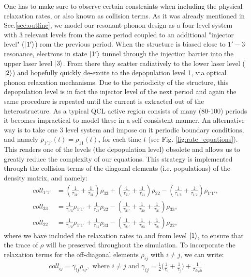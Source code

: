 \documentclass[10pt,english,fleqn]{article}%
\begin{document}
One has to make sure to observe certain constraints when including the physical relaxation rates, or also known as collision terms. As it was already mentioned in Sec.\ref{sec:outline}, we model our resonant-phonon design as a four level system with 3 relevant levels from the same period coupled to an additional "injector level" ($\Ket{1'}$)  rom the previous period. When the structure is biased close to $1'-3$ resonance, electrons in state $\Ket{1'}$ tunnel through the injection barrier into the upper
laser level $\Ket{3}$. From there they scatter radiatively to the lower laser level ($\Ket{2}$) and hopefully quickly de-excite to the depopulation level 1, via 
optical phonon relaxation mechanisms. Due to the periodicity of the structure, this depopulation level is in fact the injector level of the next period and again 
the same procedure is repeated until the current is extracted out of the heterostructure. As a typical QCL active region consists of many (80-100) 
periods it becomes impractical to model these in a self consistent manner. An alternative way is to take one 3 level system and impose on it periodic 
boundary conditions, and namely $\rho_{1'1'}(t) = \rho_{11}(t)$, for each time $t$ (see Fig. \ref{fig:rate_equations}). This renders one of the levels (the depopulation level) obsolete and allows us to greatly reduce the complexity of our equations. This strategy is implemented through the collision terms of the diagonal elements (i.e. populations) of the density matrix, and namely:
\begin{align}
 coll_{1'1'} &= (\frac{1}{\tau_{31'}}  + \frac{1}{\tau_{31}})\rho_{33} + (\frac{1}{\tau_{21'}}  + \frac{1}{\tau_{21}})\rho_{22}
 - (\frac{1}{\tau_{1'3}}  + \frac{1}{\tau_{1'2}} )\rho_{1'1'}, \\
 coll_{33} &= \frac{1}{\tau_{1'3}} \rho_{1'1'} + \frac{1}{\tau_{23}}\rho_{22}
 - (\frac{1}{\tau_{31'}} + \frac{1}{\tau_{32}} + \frac{1}{\tau_{31}} )\rho_{33}, \\
 coll_{22} &= \frac{1}{\tau_{1'2}} \rho_{1'1'} + \frac{1}{\tau_{32}}\rho_{33}
 - (\frac{1}{\tau_{21'}} + \frac{1}{\tau_{23}} + \frac{1}{\tau_{21}} )\rho_{22}, 
\end{align}
where we have included the relaxation rates to and from level $\Ket{1}$, to ensure that the trace of $\rho$ will be preserved throughout the simulation.
To incorporate the relaxation terms for the off-diagonal elements $\rho_{ij}$ with $i \neq j$, we can write: 
\begin{align}
coll_{ij} = \gamma_{ij} \rho_{ij} , \text{ where } i \neq j \text{ and } \gamma_{ij} = \frac{1}{2} \big( \frac{1}{\tau_i} + 
\frac{1}{\tau_j} \big) + \frac{1}{\tau_{deph}}
\end{align}
\end{document}
